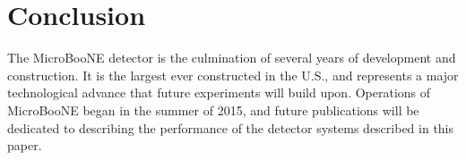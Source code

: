 \section{Conclusion}
\label{sec:conclusion}

The MicroBooNE detector is the culmination of several years of development and construction.  It is the largest \lartpc ever constructed in the U.S., and represents a major technological advance that future experiments will build upon.  Operations of MicroBooNE began in the summer of 2015, and future publications will be dedicated to describing the performance of the detector systems described in this paper.